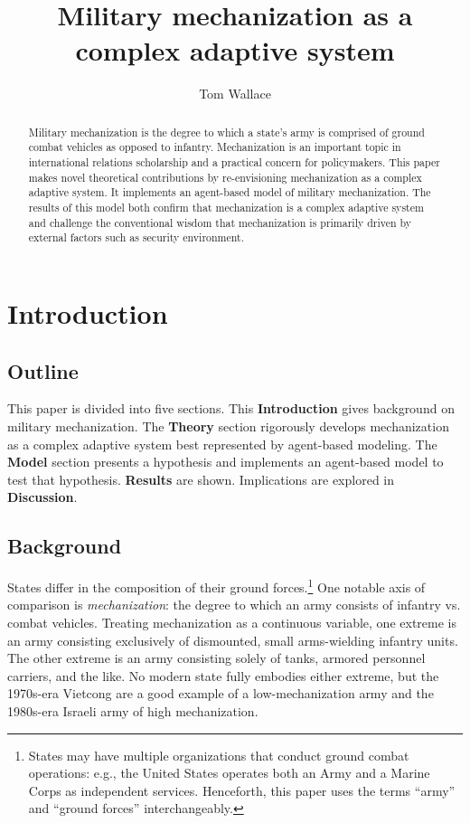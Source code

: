 \documentclass{article}
\title{Military mechanization as a complex adaptive system}
\author{Tom Wallace}
\begin{document}
\maketitle

\begin{abstract}

	Military mechanization is the degree to which a state's army is comprised of
	ground combat vehicles as opposed to infantry. Mechanization is an important topic 
	in international relations scholarship and a practical concern for
	policymakers. This paper makes novel theoretical contributions by
	re-envisioning mechanization as a complex adaptive system. It implements an
	agent-based model of military mechanization. The results of this model
	both confirm that mechanization is a complex adaptive system and
	challenge the conventional wisdom that mechanization is primarily driven
	by external factors such as security environment. 

\end{abstract}

\newpage

\section{Introduction}

\subsection{Outline}

This paper is divided into five sections. This \textbf{Introduction} gives
background on military mechanization. The \textbf{Theory} section rigorously
develops mechanization as a complex adaptive system best represented by
agent-based modeling. The \textbf{Model} section presents a hypothesis and
implements an agent-based model to test that hypothesis.
\textbf{Results} are shown. Implications are explored in \textbf{Discussion}.

\subsection{Background}

States differ in the composition of their ground forces.\footnote{States may 
have multiple organizations that
conduct ground combat operations: e.g., the United States operates both an Army
and a Marine Corps as independent services. Henceforth, this paper uses the
terms ``army'' and ``ground forces'' interchangeably.} One notable axis of comparison 
is \textit{mechanization}: the degree to which an army consists of infantry 
vs. combat vehicles. Treating mechanization as a continuous variable, 
one extreme is an army consisting exclusively of dismounted, small 
arms-wielding infantry units. The other extreme is an army consisting 
solely of tanks, armored personnel carriers, and the like.
No modern state fully embodies either extreme, but the 1970s-era Vietcong are
a good example of a low-mechanization army and the 1980s-era Israeli army of
high mechanization.
\end{document}
